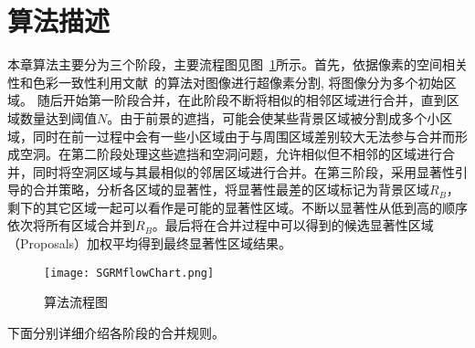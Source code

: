 \section{算法描述}
\label{sec:algorithm}
本章算法主要分为三个阶段，主要流程图见图~\ref{fig:algflow}所示。首先，依据像素的空间相关性和色彩一致性利用文献~的算法对图像进行超像素分割, 将图像分为多个初始区域。 随后开始第一阶段合并，在此阶段不断将相似的相邻区域进行合并，直到区域数量达到阈值$N$。由于前景的遮挡，可能会使某些背景区域被分割成多个小区域，同时在前一过程中会有一些小区域由于与周围区域差别较大无法参与合并而形成空洞。在第二阶段处理这些遮挡和空洞问题，允许相似但不相邻的区域进行合并，同时将空洞区域与其最相似的邻居区域进行合并。在第三阶段，采用显著性引导的合并策略，分析各区域的显著性，将显著性最差的区域标记为背景区域$R_{B}$，剩下的其它区域一起可以看作是可能的显著性区域。不断以显著性从低到高的顺序依次将所有区域合并到$R_{B}$。最后将在合并过程中可以得到的候选显著性区域（Proposals）加权平均得到最终显著性区域结果。\par
\begin{figure}[htb]
  \centering%
      {\texttt{[image: SGRMflowChart.png]}}

  \caption{算法流程图}
  \label{fig:algflow}
\end{figure}

\par
下面分别详细介绍各阶段的合并规则。

